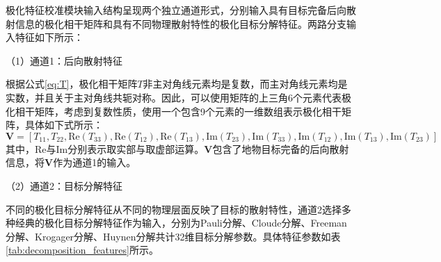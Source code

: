 极化特征校准模块输入结构呈现两个独立通道形式，分别输入具有目标完备后向散射信息的极化相干矩阵和具有不同物理散射特性的极化目标分解特征。两路分支输入特征如下所示：

（1）通道1：后向散射特征

根据公式\eqref{eq:T}，极化相干矩阵$T$非主对角线元素均是复数，而主对角线元素均是实数，并且关于主对角线共轭对称。因此，可以使用矩阵的上三角6个元素代表极化相干矩阵，考虑到复数性质，使用一个包含9个元素的一维数组表示极化相干矩阵，具体如下式所示：
\begin{equation}
    \mathbf{V}=[T_{11}, T_{22}, \text{Re}(T_{33}), \text{Re}(T_{12}), \text{Re}(T_{13}), \text{Im}(T_{23}), \text{Im}(T_{33}), \text{Im}(T_{12}), \text{Im}(T_{13}), \text{Im}(T_{23})]
\end{equation}
其中，$\text{Re}$与$\text{Im}$分别表示取实部与取虚部运算。$\mathbf{V}$包含了地物目标完备的后向散射信息，将$\mathbf{V}$作为通道1的输入。

（2）通道2：目标分解特征

不同的极化目标分解特征从不同的物理层面反映了目标的散射特性，通道2选择多种经典的极化目标分解特征作为输入，分别为Pauli分解、Cloude分解、Freeman分解、Krogager分解、Huynen分解共计32维目标分解参数。具体特征参数如表\ref{tab:decomposition_features}所示。

